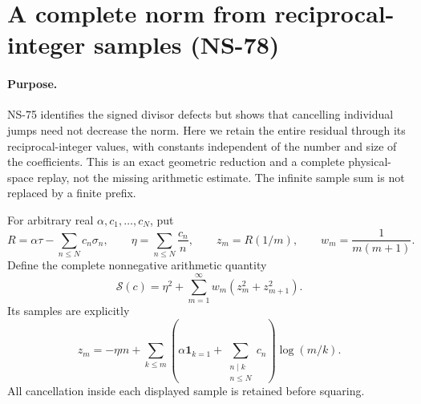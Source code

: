 \section{A complete norm from reciprocal-integer samples (NS-78)}
\label{sec:ns78-sampling}

\paragraph{Purpose.}
NS-75 identifies the signed divisor defects but shows that cancelling
individual jumps need not decrease the norm. Here we retain the entire
residual through its reciprocal-integer values, with constants independent
of the number and size of the coefficients. This is an exact geometric
reduction and a complete physical-space replay, not the missing arithmetic
estimate. The infinite sample sum is not replaced by a finite prefix.

For arbitrary real $\alpha,c_1,\ldots,c_N$, put
\[
 R=\alpha\tau-\sum_{n\leq N}c_n\sigma_n,\qquad
 \eta=\sum_{n\leq N}\frac{c_n}{n},\qquad
 z_m=R(1/m),\qquad w_m=\frac1{m(m+1)}.
\]
Define the complete nonnegative arithmetic quantity
\begin{equation}
 \mathcal S(c)=\eta^2+
       \sum_{m=1}^\infty w_m(z_m^2+z_{m+1}^2).
 \label{eq:ns78-sampling-functional}
\end{equation}
Its samples are explicitly
\[
 z_m=-\eta m+\sum_{k\leq m}
 \left(\alpha\mathbf1_{k=1}+\sum_{\substack{n\mid k\\n\leq N}}c_n\right)
                    \log(m/k).
\]
All cancellation inside each displayed sample is retained before squaring.

